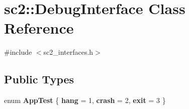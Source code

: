 \hypertarget{classsc2_1_1_debug_interface}{}\section{sc2\+:\+:Debug\+Interface Class Reference}
\label{classsc2_1_1_debug_interface}


{\ttfamily \#include $<$sc2\+\_\+interfaces.\+h$>$}

\subsection*{Public Types}
\begin{DoxyCompactItemize}
\item 
\mbox{\label{classsc2_1_1_debug_interface_a3b55d464a9bbf3e4225927cf6f6ee7cb}} 
enum {\bfseries App\+Test} \{ {\bfseries hang} = 1, 
{\bfseries crash} = 2, 
{\bfseries exit} = 3
 \}
\end{DoxyCompactItemize}
